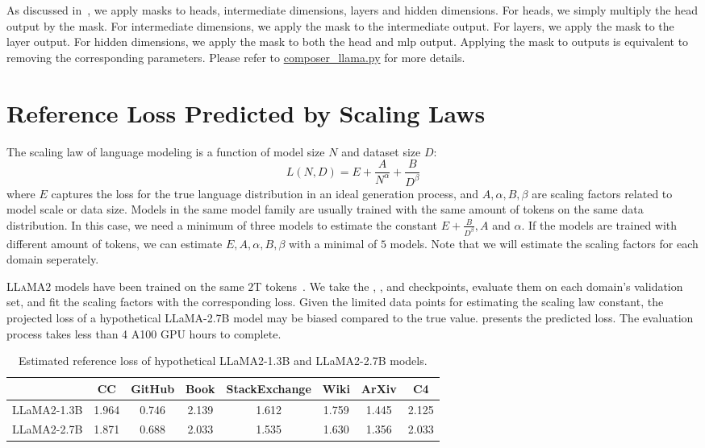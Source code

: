 As discussed in~, we apply masks to heads, intermediate dimensions, layers and hidden dimensions. For heads, we simply multiply the head output by the mask. For intermediate dimensions, we apply the mask to the intermediate output. For layers, we apply the mask to the layer output. For hidden dimensions, we apply the mask to both the head and mlp output. Applying the mask to outputs is equivalent to removing the corresponding parameters. Please refer to \href{https://github.com/princeton-nlp/LLM-Shearing/blob/main/llmshearing/models/composer\_llama.py}{composer\_llama.py} for more details.

\section{Reference Loss Predicted by Scaling Laws}
\label{app:reference_loss}
The scaling law of language modeling is a function of model size $N$ and dataset size $D$:
$$
L(N, D) = E + \frac{A}{N^{\alpha}} + \frac{B}{D^{\beta}}
$$
where $E$ captures the loss for the true language distribution in an ideal generation process, and $A, \alpha, B, \beta$ are scaling factors related to model scale or data size. Models in the same model family are usually trained with the same amount of tokens on the same data distribution. In this case, we need a minimum of three models to estimate the constant $E + \frac{B}{D^{\beta}}, A$ and $\alpha$. If the models are trained with different amount of tokens, we can estimate $E, A, \alpha, B, \beta$ with a minimal of $5$ models. Note that we will estimate the scaling factors for each domain seperately. 

\textsc{LLaMA}$2$ models have been trained on the same $2$T tokens~\citep{touvron2023llama2}. We take the \llamatsmall{}, \llamatnormal{}, and \llamatlarge{} checkpoints, evaluate them on each domain's validation set, and fit the scaling factors with the corresponding loss. Given the limited data points for estimating the scaling law constant, the projected loss of a hypothetical LLaMA-2.7B model may be biased compared to the true value.  presents the predicted loss. The evaluation process takes less than 4 A100 GPU hours to complete.

\begin{table}[h]
    \centering
    \caption{Estimated reference loss of hypothetical LLaMA2-1.3B and LLaMA2-2.7B models.}
    \label{tab:scalinglaw}
    \begin{tabular}{@{}lccccccc@{}}
    \toprule
         & \textbf{CC} & \textbf{GitHub} & \textbf{Book} & \textbf{StackExchange} & \textbf{Wiki} & \textbf{ArXiv} & \textbf{C4} \\ \midrule
         LLaMA2-1.3B & 1.964       & 0.746           & 2.139         & 1.612                  & 1.759         & 1.445          & 2.125       \\
         LLaMA2-2.7B & 1.871       & 0.688           & 2.033         & 1.535                  & 1.630         & 1.356          & 2.033       \\ \bottomrule
    \end{tabular}
\end{table}




